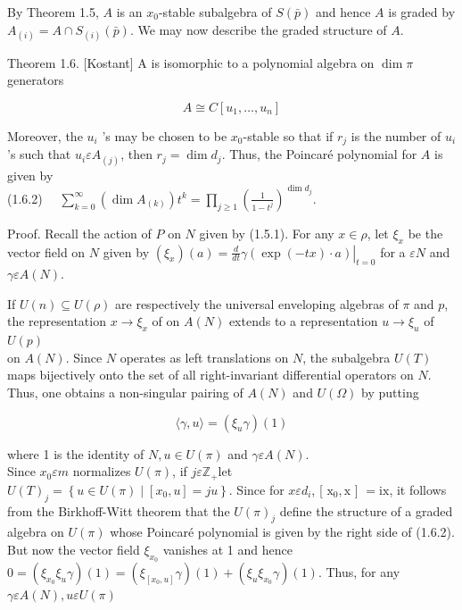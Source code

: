 \documentclass[10pt]{article}
\begin{document}
By Theorem 1.5, $A$ is an $x_{0}$-stable subalgebra of $S(\bar{p})$ and hence $A$ is graded by $A_{(i)}=A \cap S_{(i)}(\bar{p})$. We may now describe the graded structure of $A$.

Theorem 1.6. [Kostant] A is isomorphic to a polynomial algebra on $\operatorname{dim} \pi$ generators


\begin{equation*}
A \cong C\left[u_{1}, \ldots, u_{n}\right] \tag{1.6.1}
\end{equation*}


Moreover, the $u_{i}$ 's may be chosen to be $x_{0}$-stable so that if $r_{j}$ is the number of $u_{i}$ 's such that $u_{i} \varepsilon A_{(j)}$, then $r_{j}=\operatorname{dim} d_{j}$. Thus, the Poincaré polynomial for $A$ is given by\\
(1.6.2) $\quad \sum_{k=0}^{\infty}\left(\operatorname{dim} A_{(k)}\right) t^{k}=\prod_{j \geq 1}\left(\frac{1}{1-t^{j}}\right)^{\operatorname{dim} d_{j}}$.

Proof. Recall the action of $P$ on $N$ given by (1.5.1). For any $x \in \rho$, let $\xi_{x}$ be the vector field on $N$ given by $\left(\xi_{x}\right)(a)=\left.\frac{d}{d t} \gamma(\exp (-t x) \cdot a)\right|_{t=0}$ for a $\varepsilon N$ and $\gamma \varepsilon A(N)$.

If $U(n) \subseteq U(\rho)$ are respectively the universal enveloping algebras of $\pi$ and $p$, the representation $x \rightarrow \xi_{x}$ of on $A(N)$ extends to a representation $u \rightarrow \xi_{u}$ of $U(p)$\\
on $A(N)$. Since $N$ operates as left translations on $N$, the subalgebra $U(T)$ maps bijectively onto the set of all right-invariant differential operators on $N$. Thus, one obtains a non-singular pairing of $A(N)$ and $U(\Omega)$ by putting


\begin{equation*}
\langle\gamma, u\rangle=\left(\xi_{u} \gamma\right)(1) \tag{1.6.3}
\end{equation*}


where 1 is the identity of $N, u \in U(\pi)$ and $\gamma \varepsilon A(N)$.\\
Since $x_{0} \varepsilon m$ normalizes $U(\pi)$, if $j \varepsilon \mathbb{Z}_{+}$let $U(T)_{j}=\left\{u \in U(\pi) \mid\left[x_{0}, u\right]=j u\right\}$. Since for $x \varepsilon d_{i}$, [ $\mathrm{x}_{0}, \mathrm{x}$ ] $=\mathrm{ix}$, it follows from the Birkhoff-Witt theorem that the $U(\pi)_{j}$ define the structure of a graded algebra on $U(\pi)$ whose Poincaré polynomial is given by the right side of (1.6.2). But now the vector field $\xi_{x_{0}}$ vanishes at 1 and hence $0=\left(\xi_{x_{0}} \xi_{u} \gamma\right)(1)=\left(\xi_{\left[x_{0}, u\right]} \gamma\right)(1)+ \left(\xi_{u} \xi_{x_{0}} \gamma\right)(1)$. Thus, for any $\gamma \varepsilon A(N), u \varepsilon U(\pi)$
\end{document}
